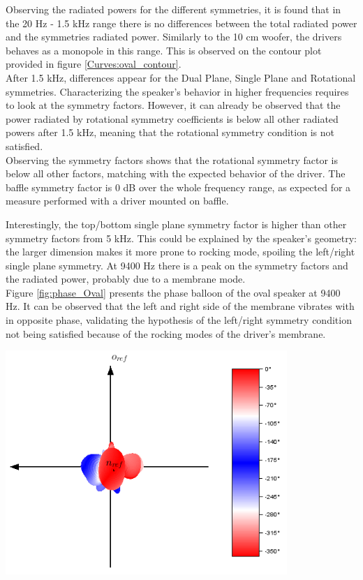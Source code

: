 \documentclass{report}
\begin{document}
Observing the radiated powers for the different symmetries, it is found that in the 20 Hz - 1.5 kHz range there is no differences between the total radiated power and the symmetries radiated power. Similarly to the 10 cm woofer, the drivers behaves as a monopole in this range. This is observed on the contour plot provided in figure \ref{Curves:oval_contour}. \\
After 1.5 kHz, differences appear for the Dual Plane, Single Plane and Rotational symmetries. Characterizing the speaker's behavior in higher frequencies requires to look at the symmetry factors. However, it can already be observed that the power radiated by rotational symmetry coefficients is below all other radiated powers after 1.5 kHz, meaning that the rotational symmetry condition is not satisfied. \\

Observing the symmetry factors shows that the rotational symmetry factor is below all other factors, matching with the expected behavior of the driver. The baffle symmetry factor is 0 dB over the whole frequency range, as expected for a measure performed with a driver mounted on baffle.

\begin{minipage}{0.5\textwidth}
Interestingly, the top/bottom single plane symmetry factor is higher than other symmetry factors from 5 kHz. This could be explained by the speaker's geometry: the larger dimension makes it more prone to rocking mode, spoiling the left/right single plane symmetry. At 9400 Hz there is a peak on the symmetry factors and the radiated power, probably due to a membrane mode.\\

Figure \ref{fig:phase_Oval} presents the phase balloon of the oval speaker at 9400 Hz. It can be observed that the left and right side of the membrane vibrates with in opposite phase, validating the hypothesis of the left/right symmetry condition not being satisfied because of the rocking modes of the driver's membrane. 
\end{minipage}
\begin{minipage}{0.5\textwidth}
\begin{center}
	\includegraphics[width=0.8\textwidth]{Sym/phase_oval} 
    \captionsetup{hypcap=false} 
	\label{fig:phase_Oval}
\end{center}
\end{minipage}
\end{document}

